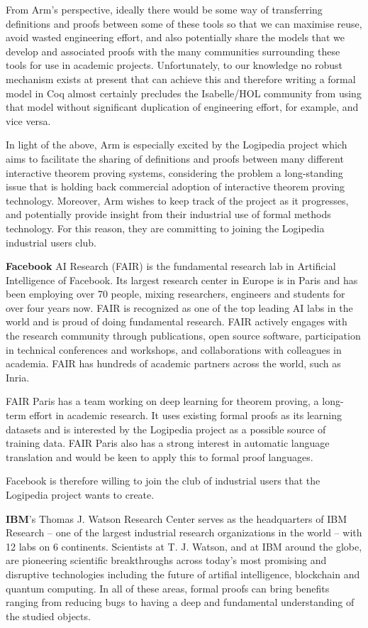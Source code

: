 From Arm’s perspective, ideally there would be some way of
transferring definitions and proofs between some of these tools so
that we can maximise reuse, avoid wasted engineering effort, and also
potentially share the models that we develop and associated proofs
with the many communities surrounding these tools for use in academic
projects. Unfortunately, to our knowledge no robust mechanism exists
at present that can achieve this and therefore writing a formal model
in Coq almost certainly precludes the Isabelle/HOL community from
using that model without significant duplication of engineering
effort, for example, and vice versa.

In light of the above, Arm is especially excited by the Logipedia
project which aims to facilitate the sharing of definitions and proofs
between many different interactive theorem proving systems,
considering the problem a long-standing issue that is holding back
commercial adoption of interactive theorem proving technology.
Moreover, Arm wishes to keep track of the project as it progresses,
and potentially provide insight from their industrial use of formal
methods technology. For this reason, they are committing to joining
the Logipedia industrial users club.


{\bf Facebook} AI Research (FAIR) is the fundamental research lab in
Artificial Intelligence of Facebook. Its largest research center in
Europe is in Paris and has been employing over 70 people, mixing
researchers, engineers and students for over four years now. FAIR is
recognized as one of the top leading AI labs in the world and is proud
of doing fundamental research. FAIR actively engages with the research
community through publications, open source software, participation in
technical conferences and workshops, and collaborations with
colleagues in academia. FAIR has hundreds of academic partners across
the world, such as Inria.

FAIR Paris has a team working on deep learning for theorem proving, a
long-term effort in academic research. It uses existing formal proofs
as its learning datasets and is interested by the Logipedia project as
a possible source of training data. FAIR Paris also has a strong
interest in automatic language translation and would be keen to apply
this to formal proof languages.

Facebook is therefore willing to join the club of industrial users
that the Logipedia project wants to create.

{\bf IBM}'s Thomas J. Watson Research Center serves as the
headquarters of IBM Research -- one of the largest industrial research
organizations in the world -- with 12 labs on 6 continents. Scientists
at T. J. Watson, and at IBM around the globe, are pioneering
scientific breakthroughs across today's most promising and disruptive
technologies including the future of artifial intelligence, blockchain
and quantum computing. In all of these areas, formal proofs can bring
benefits ranging from reducing bugs to having a deep and fundamental
understanding of the studied objects.

